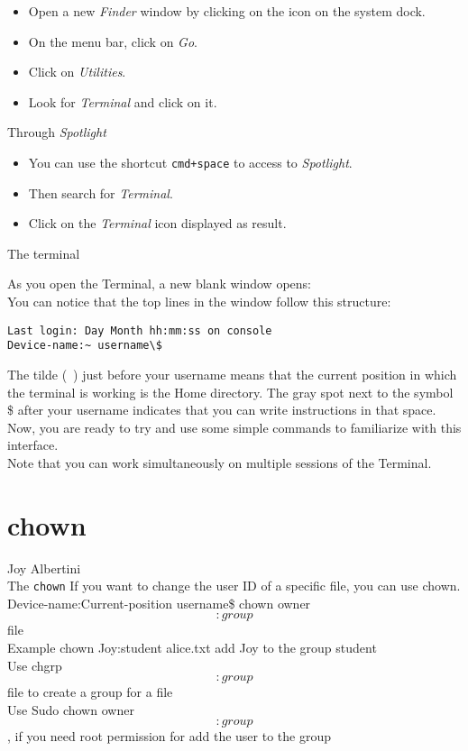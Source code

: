 \documentclass[hidelinks,12pt,a4paper,numbers=enddot]{scrartcl}
\begin{document}
\begin{itemize}
  \item Open a new \emph{Finder} window by clicking on the icon on the system dock.
  \item On the menu bar, click on \emph{Go}.
  \item Click on \emph{Utilities}.
  \item Look for \emph{Terminal} and click on it.
\end{itemize}



Through \emph{Spotlight}
\begin{itemize}
  \item You can use the shortcut \texttt{cmd+space} to access to \emph{Spotlight}.
  \item Then search for \emph{Terminal}.
  \item Click on the \emph{Terminal} icon displayed as result.
\end{itemize}



The terminal

As you open the Terminal, a new blank window opens:\\
You can notice that the top lines in the window follow this structure:

\begin{verbatim}
Last login: Day Month hh:mm:ss on console
Device-name:~ username\$
\end{verbatim}

The tilde (~) just before your username means that the current position in
which the terminal is working is the Home directory. The gray spot next to
the symbol \$ after your username indicates that you can write instructions
in that space.\\

Now, you are ready to try and use some simple commands
to familiarize with this interface.\\

Note that you can work simultaneously on multiple sessions of the Terminal.

\section{chown}


\large Joy Albertini \normalsize\\




The \texttt{chown}
If you want to change the user ID of a specific file, you can use chown. \\
Device-name:Current-position username\$ chown owner\[:group\] file \\
Example chown Joy:student alice.txt add Joy to the group student \\
Use chgrp \[:group\] file to create a group for a file \\
Use Sudo chown owner\[:group\], if you need root permission for add the user to the group 
\end{document}
